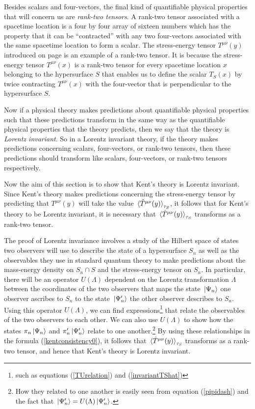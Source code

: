 Besides scalars and four-vectors, the final kind of quantifiable physical properties that will concern us are \emph{rank-two tensors}. A rank-two tensor associated with a spacetime location is a four by four array of sixteen numbers which has the property that it can be ``contracted'' with any two four-vectors associated with the same spacetime location to form a scalar. The stress-energy tensor $T^{\mu\nu}(y)$ introduced on page \pageref{stressenergy} is an example of a rank-two tensor. It is because the stress-energy tensor $T^{\mu\nu}(x)$ is a rank-two tensor for every spacetime location $x$ belonging to the hypersurface $S$ that enables us to define the scalar $T_S(x)$ by twice contracting $T^{\mu\nu}(x)$ with the four-vector that is perpendicular to the hypersurface $S$.

Now if a physical theory makes predictions about quantifiable physical properties such that these predictions transform in the same way as the quantifiable physical properties that the theory predicts, then we say that the theory is \emph{Lorentz invariant}. So in a Lorentz invariant theory, if the theory makes predictions concerning scalars, four-vectors, or rank-two tensors,  then these predictions should transform like scalars, four-vectors, or rank-two tensors respectively. 

Now the aim of this section is to show that Kent's theory is Lorentz invariant. Since Kent's theory makes predictions concerning the stress-energy tensor by predicting that ${T^{\mu\nu}(y)}$ will take the value $\ev*{\hat{T}^{\mu\nu}(y)}_{\tau_S}$, it follows that for Kent's theory to be Lorentz invariant, it is necessary that  $\ev*{\hat{T}^{\mu\nu}(y)}_{\tau_S}$ transforms as a rank-two tensor. 

The proof of Lorentz invariance involves a study of the Hilbert space of states two observers will use to describe the state of a hypersurface $S_n$ as well as the observables they use in standard quantum theory to make predictions about the mass-energy density on  $S_n\cap S$ and the stress-energy tensor on $S_n$. In particular, there will be an operator $U(\Lambda)$ dependent on the Lorentz transformation $\Lambda$ between the coordinates of the two observers that maps the state $\ket*{\Psi_n}$ one observer ascribes to $S_n$ to the state $\ket*{\Psi_n'}$ the other observer describes to $S_n$. Using this operator $U(\Lambda)$, we can find expressions\footnote{such as equations (\ref{TUrelation}) and (\ref{invariantTShat})} that relate the observables of the two observers to each other. We can also use $U(\Lambda)$ to show how the states $\pi_n\ket*{\Psi_n}$ and $\pi_n'\ket*{\Psi_n'}$ relate to one another.\footnote{How they related to one another is easily seen from equation (\ref{pipidash}) and the fact that $\ket*{\Psi_n'}=U(\Lambda)\ket*{\Psi_n'}$.} By using these relationships in the formula (\ref{kentconsistency0}), it follows that $\ev*{\hat{T}^{\mu\nu}(y)}_{\tau_S}$ transforms as a rank-two tensor, and hence that Kent's theory is Lorentz invariant.


